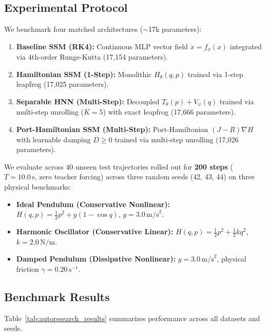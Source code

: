 \documentclass[11pt,a4paper]{article}
\begin{document}
\subsection{Experimental Protocol}
We benchmark four matched architectures ($\sim$17k parameters):
\begin{enumerate}
    \item \textbf{Baseline SSM (RK4):} Continuous MLP vector field $\dot{x} = f_\phi(x)$ integrated via 4th-order Runge-Kutta (17,154 parameters).
    \item \textbf{Hamiltonian SSM (1-Step):} Monolithic $H_\theta(q, p)$ trained via 1-step leapfrog (17,025 parameters).
    \item \textbf{Separable HNN (Multi-Step):} Decoupled $T_\theta(p) + V_\psi(q)$ trained via multi-step unrolling ($K=5$) with exact leapfrog (17,666 parameters).
    \item \textbf{Port-Hamiltonian SSM (Multi-Step):} Port-Hamiltonian $(J - R)\nabla H$ with learnable damping $D \ge 0$ trained via multi-step unrolling (17,026 parameters).
\end{enumerate}

We evaluate across 40 unseen test trajectories rolled out for \textbf{200 steps} ($T = 10.0\,\text{s}$, zero teacher forcing) across three random seeds (42, 43, 44) on three physical benchmarks:
\begin{itemize}
    \item \textbf{Ideal Pendulum (Conservative Nonlinear):} $H(q, p) = \frac{1}{2} p^2 + g(1 - \cos q)$, $g = 3.0\,\text{m/s}^2$.
    \item \textbf{Harmonic Oscillator (Conservative Linear):} $H(q, p) = \frac{1}{2} p^2 + \frac{1}{2} k q^2$, $k = 2.0\,\text{N/m}$.
    \item \textbf{Damped Pendulum (Dissipative Nonlinear):} $g = 3.0\,\text{m/s}^2$, physical friction $\gamma = 0.20\,\text{s}^{-1}$.
\end{itemize}

\subsection{Benchmark Results}
Table~\ref{tab:autoresearch_results} summarizes performance across all datasets and seeds.
\end{document}

